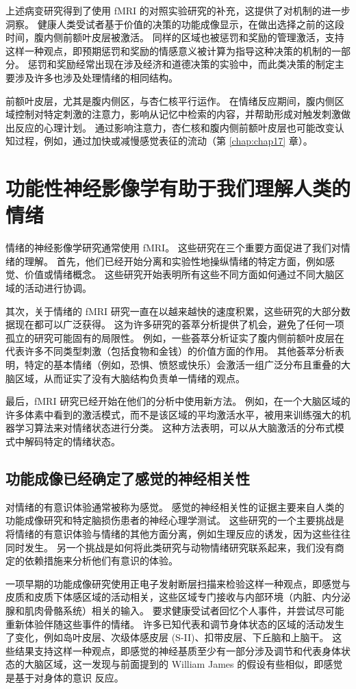 上述病变研究得到了使用 fMRI 的对照实验研究的补充，这提供了对机制的进一步洞察。 健康人类受试者基于价值的决策的功能成像显示，在做出选择之前的这段时间，腹内侧前额叶皮层被激活。 同样的区域也被惩罚和奖励的管理激活，支持这样一种观点，即预期惩罚和奖励的情感意义被计算为指导这种决策的机制的一部分。 惩罚和奖励经常出现在涉及经济和道德决策的实验中，而此类决策的制定主要涉及许多也涉及处理情绪的相同结构。

前额叶皮层，尤其是腹内侧区，与杏仁核平行运作。 在情绪反应期间，腹内侧区域控制对特定刺激的注意力，影响从记忆中检索的内容，并帮助形成对触发刺激做出反应的心理计划。 通过影响注意力，杏仁核和腹内侧前额叶皮层也可能改变认知过程，例如，通过加快或减慢感觉表征的流动（第 \ref{chap:chap17} 章）。


\section{功能性神经影像学有助于我们理解人类的情绪}

情绪的神经影像学研究通常使用 fMRI。 这些研究在三个重要方面促进了我们对情绪的理解。 首先，他们已经开始分离和实验性地操纵情绪的特定方面，例如感觉、价值或情绪概念。 这些研究开始表明所有这些不同方面如何通过不同大脑区域的活动进行协调。

其次，关于情绪的 fMRI 研究一直在以越来越快的速度积累，这些研究的大部分数据现在都可以广泛获得。 这为许多研究的荟萃分析提供了机会，避免了任何一项孤立的研究可能固有的局限性。 例如，一些荟萃分析证实了腹内侧前额叶皮层在代表许多不同类型刺激（包括食物和金钱）的价值方面的作用。 其他荟萃分析表明，特定的基本情绪（例如，恐惧、愤怒或快乐）会激活一组广泛分布且重叠的大脑区域，从而证实了没有大脑结构负责单一情绪的观点。

最后，fMRI 研究已经开始在他们的分析中使用新方法。 例如，在一个大脑区域的许多体素中看到的激活模式，而不是该区域的平均激活水平，被用来训练强大的机器学习算法来对情绪状态进行分类。 这种方法表明，可以从大脑激活的分布式模式中解码特定的情绪状态。

\subsection{功能成像已经确定了感觉的神经相关性}
对情绪的有意识体验通常被称为感觉。 感觉的神经相关性的证据主要来自人类的功能成像研究和特定脑损伤患者的神经心理学测试。 这些研究的一个主要挑战是将情绪的有意识体验与情绪的其他方面分离，例如生理反应的诱发，因为这些往往同时发生。 另一个挑战是如何将此类研究与动物情绪研究联系起来，我们没有商定的依赖措施来分析他们有意识的体验。

一项早期的功能成像研究使用正电子发射断层扫描来检验这样一种观点，即感觉与皮质和皮质下体感区域的活动相关，这些区域专门接收与内部环境（内脏、内分泌腺和肌肉骨骼系统）相关的输入。 要求健康受试者回忆个人事件，并尝试尽可能重新体验伴随这些事件的情绪。 许多已知代表和调节身体状态的区域的活动发生了变化，例如岛叶皮层、次级体感皮层 (S-II)、扣带皮层、下丘脑和上脑干。 这些结果支持这样一种观点，即感觉的神经基质至少有一部分涉及调节和代表身体状态的大脑区域，这一发现与前面提到的 William James 的假设有些相似，即感觉是基于对身体的意识 反应。

